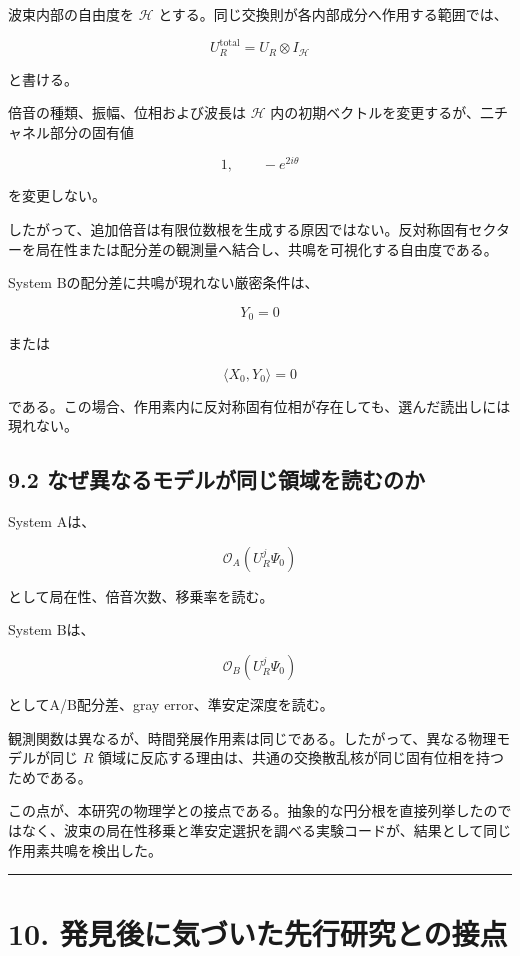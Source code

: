 \documentclass[
  10pt,
  a4paper,
]{article}
\begin{document}
波束内部の自由度を \(\mathcal H\)
とする。同じ交換則が各内部成分へ作用する範囲では、

\[
U_R^{\mathrm{total}}
=U_R\otimes I_{\mathcal H}
\]

と書ける。

倍音の種類、振幅、位相および波長は \(\mathcal H\)
内の初期ベクトルを変更するが、二チャネル部分の固有値

\[
1,\qquad -e^{2i\theta}
\]

を変更しない。

したがって、追加倍音は有限位数根を生成する原因ではない。反対称固有セクターを局在性または配分差の観測量へ結合し、共鳴を可視化する自由度である。

System Bの配分差に共鳴が現れない厳密条件は、

\[
Y_0=0
\]

または

\[
\langle X_0,Y_0\rangle=0
\]

である。この場合、作用素内に反対称固有位相が存在しても、選んだ読出しには現れない。

\subsection{9.2
なぜ異なるモデルが同じ領域を読むのか}\label{ux306aux305cux7570ux306aux308bux30e2ux30c7ux30ebux304cux540cux3058ux9818ux57dfux3092ux8aadux3080ux306eux304b}

System Aは、

\[
\mathcal O_A(U_R^j\Psi_0)
\]

として局在性、倍音次数、移乗率を読む。

System Bは、

\[
\mathcal O_B(U_R^j\Psi_0)
\]

としてA/B配分差、gray error、準安定深度を読む。

観測関数は異なるが、時間発展作用素は同じである。したがって、異なる物理モデルが同じ
\(R\)
領域に反応する理由は、共通の交換散乱核が同じ固有位相を持つためである。

この点が、本研究の物理学との接点である。抽象的な円分根を直接列挙したのではなく、波束の局在性移乗と準安定選択を調べる実験コードが、結果として同じ作用素共鳴を検出した。

\begin{center}\rule{0.5\linewidth}{0.5pt}\end{center}

\section{10.
発見後に気づいた先行研究との接点}\label{ux767aux898bux5f8cux306bux6c17ux3065ux3044ux305fux5148ux884cux7814ux7a76ux3068ux306eux63a5ux70b9}
\end{document}
